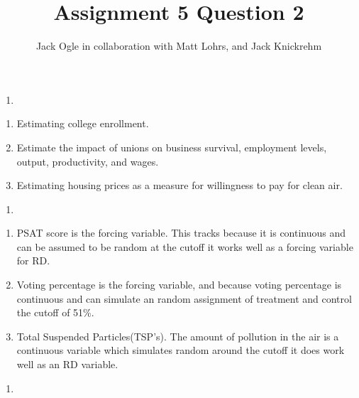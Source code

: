 \documentclass[
  12pt,
  landscape]{article}
\title{Assignment 5 Question 2}
\author{Jack Ogle in collaboration with Matt Lohrs, and Jack Knickrehm}
\date{}
\begin{document}
\maketitle

\begin{enumerate}
\def\labelenumi{(\alph{enumi})}
\item
\end{enumerate}

\begin{enumerate}
\def\labelenumi{\roman{enumi})}
\item
  Estimating college enrollment.
\item
  Estimate the impact of unions on business survival, employment levels,
  output, productivity, and wages.
\item
  Estimating housing prices as a measure for willingness to pay for
  clean air.
\end{enumerate}

\begin{enumerate}
\def\labelenumi{(\alph{enumi})}
\setcounter{enumi}{1}
\item
\end{enumerate}

\begin{enumerate}
\def\labelenumi{\roman{enumi})}
\item
  PSAT score is the forcing variable. This tracks because it is
  continuous and can be assumed to be random at the cutoff it works well
  as a forcing variable for RD.
\item
  Voting percentage is the forcing variable, and because voting
  percentage is continuous and can simulate an random assignment of
  treatment and control the cutoff of 51\%.
\item
  Total Suspended Particles(TSP's). The amount of pollution in the air
  is a continuous variable which simulates random around the cutoff it
  does work well as an RD variable.
\end{enumerate}

\begin{enumerate}
\def\labelenumi{(\alph{enumi})}
\setcounter{enumi}{2}
\item
\end{enumerate}
\end{document}
